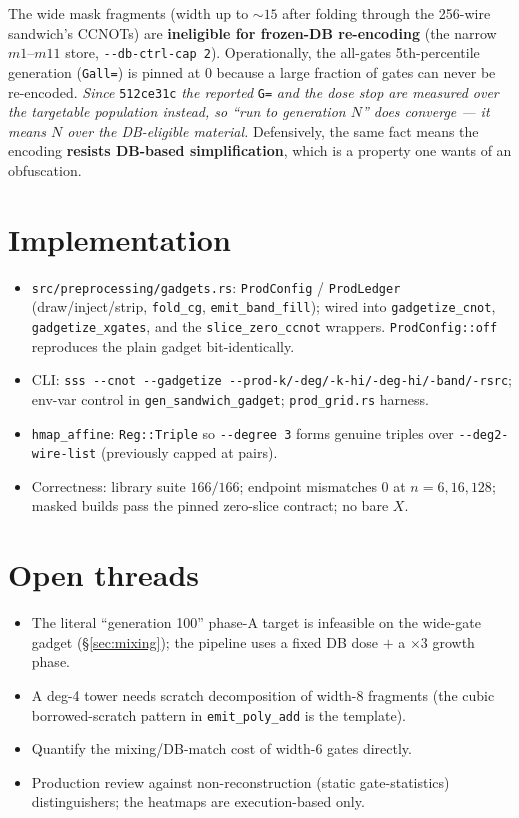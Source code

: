 \documentclass[11pt]{article}
\begin{document}
The wide mask fragments (width up to ${\sim}15$ after folding through the
256-wire sandwich's CCNOTs) are \textbf{ineligible for frozen-DB re-encoding}
(the narrow $m1$--$m11$ store, \texttt{-{}-db-ctrl-cap 2}). Operationally,
the all-gates 5th-percentile generation (\texttt{Gall=}) is pinned at 0 because
a large fraction of gates can never be re-encoded. \emph{Since} \texttt{512ce31c}
\emph{the reported} \texttt{G=} \emph{and the dose stop are measured over the
targetable population instead, so ``run to generation $N$'' does converge --- it
means $N$ over the DB-eligible material.} Defensively, the same
fact means the encoding \textbf{resists DB-based simplification}, which is a
property one wants of an obfuscation.

\section{Implementation}

\begin{itemize}
\item \texttt{src/preprocessing/gadgets.rs}: \texttt{ProdConfig} / \texttt{ProdLedger}
(draw/inject/strip, \texttt{fold\_cg}, \texttt{emit\_band\_fill}); wired into
\texttt{gadgetize\_cnot}, \texttt{gadgetize\_xgates}, and the
\texttt{slice\_zero\_ccnot} wrappers. \texttt{ProdConfig::off} reproduces the
plain gadget bit-identically.
\item CLI: \texttt{sss -{}-cnot -{}-gadgetize -{}-prod-k/-deg/-k-hi/-deg-hi/-band/-rsrc};
env-var control in \texttt{gen\_sandwich\_gadget}; \texttt{prod\_grid.rs} harness.
\item \texttt{hmap\_affine}: \texttt{Reg::Triple} so \texttt{-{}-degree 3} forms
genuine triples over \texttt{-{}-deg2-wire-list} (previously capped at pairs).
\item Correctness: library suite $166/166$; endpoint mismatches $0$ at
$n=6,16,128$; masked builds pass the pinned zero-slice contract; no bare $X$.
\end{itemize}

\section{Open threads}
\begin{itemize}
\item The literal ``generation 100'' phase-A target is infeasible on the
wide-gate gadget (\S\ref{sec:mixing}); the pipeline uses a fixed DB dose $+$ a
$\times3$ growth phase.
\item A deg-4 tower needs scratch decomposition of width-8 fragments (the cubic
borrowed-scratch pattern in \texttt{emit\_poly\_add} is the template).
\item Quantify the mixing/DB-match cost of width-6 gates directly.
\item Production review against non-reconstruction (static gate-statistics)
distinguishers; the heatmaps are execution-based only.
\end{itemize}
\end{document}

